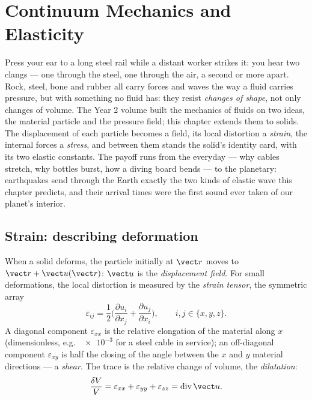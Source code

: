 \chapter{Continuum Mechanics and Elasticity}\label{ch:b3:continuum-elasticity}

Press your ear to a long steel rail while a distant worker strikes it:
you hear two clangs --- one through the steel, one through the air, a
second or more apart. Rock, steel, bone and rubber all carry forces
and waves the way a fluid carries pressure, but with something no
fluid has: they resist \emph{changes of shape}, not only changes of
volume. The Year 2 volume built the mechanics of fluids on two ideas,
the material particle and the pressure field; this chapter extends
them to solids. The displacement of each particle becomes a field, its
local distortion a \emph{strain}, the internal forces a \emph{stress},
and between them stands the solid's identity card,  with
its two elastic constants. The payoff runs from the everyday --- why
cables stretch, why bottles burst, how a diving board bends --- to the
planetary: earthquakes send through the Earth exactly the two kinds of
elastic wave this chapter predicts, and their arrival times were the
first sound ever taken of our planet's interior.

\section{Strain: describing deformation}

\begin{definition}\label{def:b3:continuum-elasticity:strain}
When a solid deforms, the particle initially at $\vect r$ moves to
$\vect r + \vect u(\vect r)$: $\vect u$ is the \emph{displacement
field}. For small deformations, the local distortion is measured by
the \emph{strain tensor}, the symmetric array
\[
\varepsilon_{ij} = \frac12\Big(
 \frac{\partial u_i}{\partial x_j} + \frac{\partial u_j}{\partial x_i}
\Big) , \qquad i, j \in \{x, y, z\} .
\]
A diagonal component $\varepsilon_{xx}$ is the relative elongation of
the material along $x$ (dimensionless, e.g.\ $\num{e-3}$ for a steel
cable in service); an off-diagonal component $\varepsilon_{xy}$ is half
the closing of the angle between the $x$ and $y$ material directions
--- a \emph{shear}. The trace is the relative change of volume, the
\emph{dilatation}:
\[
\frac{\delta V}{V} = \varepsilon_{xx} + \varepsilon_{yy} +
\varepsilon_{zz} = \operatorname{div}\vect u .
\]
\end{definition}

